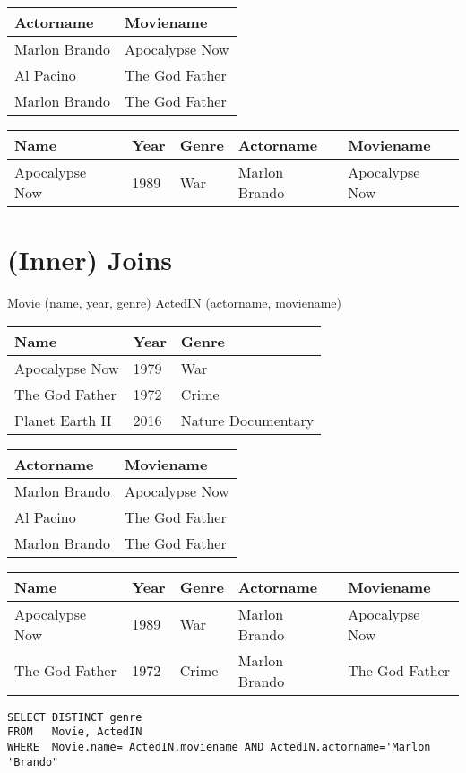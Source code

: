 \documentclass{article}
\begin{document}
\begin{tabular}{ll}
\hline
Actorname & Moviename \\
\hline
Marlon Brando & Apocalypse Now \\
Al Pacino & The God Father \\
Marlon Brando & The God Father \\
\hline
\end{tabular}

\begin{tabular}{lllll}
\hline
Name & Year & Genre & Actorname & Moviename \\
\hline
Apocalypse Now & 1989 & War & Marlon Brando & Apocalypse Now \\
\hline
\end{tabular}

\section*{(Inner) Joins}
Movie (name, year, genre)
ActedIN (actorname, moviename)

\begin{tabular}{lll}
\hline
Name & Year & Genre \\
\hline
Apocalypse Now & 1979 & War \\
The God Father & 1972 & Crime \\
Planet Earth II & 2016 & Nature Documentary \\
\hline
\end{tabular}

\begin{tabular}{ll}
\hline
Actorname & Moviename \\
\hline
Marlon Brando & Apocalypse Now \\
Al Pacino & The God Father \\
Marlon Brando & The God Father \\
\hline
\end{tabular}

\begin{tabular}{lllll}
\hline
Name & Year & Genre & Actorname & Moviename \\
\hline
Apocalypse Now & 1989 & War & Marlon Brando & Apocalypse Now \\
The God Father & 1972 & Crime & Marlon Brando & The God Father \\
\hline
\end{tabular}
\begin{verbatim}
SELECT DISTINCT genre
FROM   Movie, ActedIN
WHERE  Movie.name= ActedIN.moviename AND ActedIN.actorname='Marlon 'Brando"
\end{verbatim}
\end{document}

